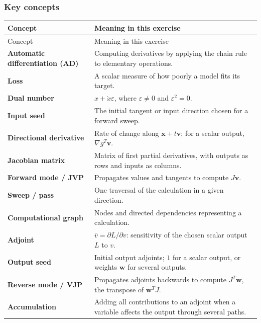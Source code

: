 \documentclass{course_sheet}
\begin{document}
\subsubsection*{Key concepts}
\begingroup
\small
\setlength{\tabcolsep}{4pt}
\begin{longtable}{p{}p{}}
\hline
Concept & Meaning in this exercise \\
\hline
\endfirsthead
Concept & Meaning in this exercise \\
\hline
\endhead
\textbf{Automatic differentiation (AD)} & Computing derivatives by applying the chain rule to elementary operations. \\[1.5pt]
\textbf{Loss} & A scalar measure of how poorly a model fits its target. \\[1.5pt]
\textbf{Dual number} & $x+\dot x\varepsilon$, where $\varepsilon\ne0$ and $\varepsilon^2=0$. \\[1.5pt]
\textbf{Input seed} & The initial tangent or input direction chosen for a forward sweep. \\[1.5pt]
\textbf{Directional derivative} & Rate of change along $\mathbf x+t\mathbf v$; for a scalar output, $\nabla g^T\mathbf v$. \\[1.5pt]
\textbf{Jacobian matrix} & Matrix of first partial derivatives, with outputs as rows and inputs as columns. \\[1.5pt]
\textbf{Forward mode / JVP} & Propagates values and tangents to compute $J\mathbf v$. \\[1.5pt]
\textbf{Sweep / pass} & One traversal of the calculation in a given direction. \\[1.5pt]
\textbf{Computational graph} & Nodes and directed dependencies representing a calculation. \\[1.5pt]
\textbf{Adjoint} & $\bar v=\partial L/\partial v$: sensitivity of the chosen scalar output $L$ to $v$. \\[1.5pt]
\textbf{Output seed} & Initial output adjoints; $1$ for a scalar output, or weights $\mathbf w$ for several outputs. \\[1.5pt]
\textbf{Reverse mode / VJP} & Propagates adjoints backwards to compute $J^T\mathbf w$, the transpose of $\mathbf w^TJ$. \\[1.5pt]
\textbf{Accumulation} & Adding all contributions to an adjoint when a variable affects the output through several paths. \\[1.5pt]
\hline
\end{longtable}
\endgroup
\end{document}
